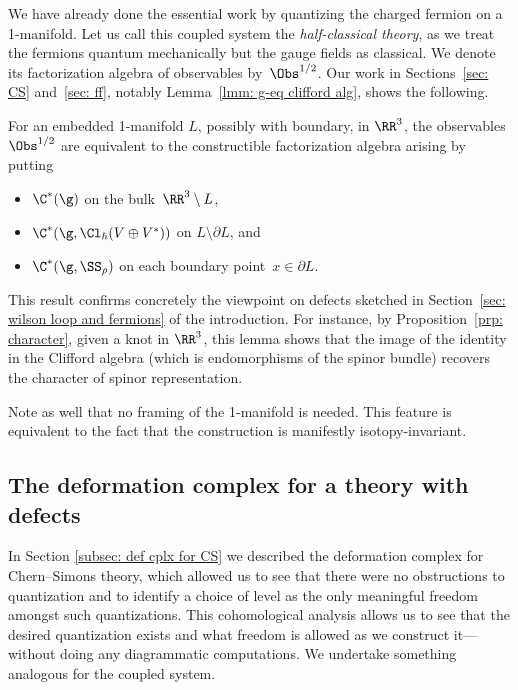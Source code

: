 \documentclass[10pt]{amsart}
\begin{document}
We have already done the essential work by quantizing the charged fermion on a 1-manifold.
Let us call this coupled system the {\em half-classical theory},
as we treat the fermions quantum mechanically but the gauge fields as classical. 
We denote its factorization algebra of observables by~$\Obs^{1/2}$.
Our work in Sections~\ref{sec: CS} and~\ref{sec: ff}, notably Lemma~\ref{lmm: g-eq clifford alg}, shows the following.

\begin{lmm}
For an embedded 1-manifold $L$, possibly with boundary, in $\RR^3$, 
the observables $\Obs^{1/2}$ are equivalent to 
the constructible factorization algebra arising by putting
\begin{itemize}
\item $\C^*(\g)$ on the bulk~$\RR^3 \setminus L$,
\item $\C^*(\g,\Cl_\hbar(V \oplus V^*))$ on $L \setminus \partial L$, and
\item $\C^*(\g,\SS_\rho)$ on each boundary point~$x \in \partial L$.
\end{itemize}
\end{lmm}

This result confirms concretely the viewpoint on defects sketched in Section~\ref{sec: wilson loop and fermions} of the introduction.
For instance, by Proposition~\ref{prp: character},
given a knot in $\RR^3$, 
this lemma shows that the image of the identity in the Clifford algebra (which is endomorphisms of the spinor bundle) recovers the character of spinor representation.

\begin{rmk}
Note as well that no framing of the 1-manifold is needed.
This feature is equivalent to the fact that the construction is manifestly isotopy-invariant.
\end{rmk}

\subsection{The deformation complex for a theory with defects}
\label{subsec: def complex for defects}

In Section \ref{subsec: def cplx for CS} we described the deformation complex for Chern--Simons theory,
which allowed us to see that there were no obstructions to quantization and to identify a choice of level as the only meaningful freedom amongst such quantizations.
This cohomological analysis allows us to see that the desired quantization exists and what freedom is allowed as we construct it---without doing any diagrammatic computations.
We undertake something analogous for the coupled system.
\end{document}
